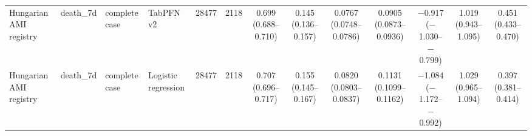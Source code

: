 \begin{center}
{\begin{tabular}{llllrrccccccc}
Hungarian AMI registry & death\_7d & complete case & TabPFN v2 & 28477 & 2118 & 0.699 (0.688--0.710) & 0.145 (0.136--0.157) & 0.0767 (0.0748--0.0786) & 0.0905 (0.0873--0.0936) & $-$0.917 ($-$1.030--$-$0.799) & 1.019 (0.943--1.095) & 0.451 (0.433--0.470) \\
Hungarian AMI registry & death\_7d & complete case & Logistic regression & 28477 & 2118 & 0.707 (0.696--0.717) & 0.155 (0.145--0.167) & 0.0820 (0.0803--0.0837) & 0.1131 (0.1099--0.1162) & $-$1.084 ($-$1.172--$-$0.992) & 1.029 (0.965--1.094) & 0.397 (0.381--0.414) \\
\bottomrule
\end{tabular}%
}
\end{center}
